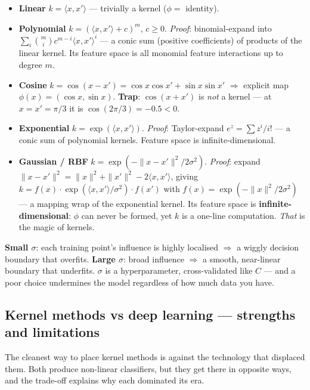 \documentclass[11pt, a4paper]{article}
\newcommand{\kw}[1]{\textbf{#1}}
\begin{document}
\begin{itemize}
  \item \kw{Linear} $k=\langle x,x'\rangle$ — trivially a kernel ($\phi=$ identity).
  \item \kw{Polynomial} $k=(\langle x,x'\rangle+c)^m$, $c\ge0$. \emph{Proof}: binomial-expand into
  $\sum_i\binom mi c^{m-i}\langle x,x'\rangle^i$ — a conic sum (positive coefficients) of products of
  the linear kernel. Its feature space is all monomial feature interactions up to degree $m$.
  \item \kw{Cosine} $k=\cos(x-x')=\cos x\cos x'+\sin x\sin x'$ $\Rightarrow$ explicit map
  $\phi(x)=(\cos x,\sin x)$. \kw{Trap}: $\cos(x{+}x')$ is \emph{not} a kernel — at $x=x'=\pi/3$ it is
  $\cos(2\pi/3)=-0.5<0$.
  \item \kw{Exponential} $k=\exp(\langle x,x'\rangle)$. \emph{Proof}: Taylor-expand
  $e^z=\sum z^i/i!$ — a conic sum of polynomial kernels. Feature space is infinite-dimensional.
  \item \kw{Gaussian / RBF} $k=\exp(-\|x-x'\|^2/2\sigma^2)$. \emph{Proof}: expand
  $\|x-x'\|^2=\|x\|^2+\|x'\|^2-2\langle x,x'\rangle$, giving
  $k=f(x)\cdot\exp(\langle x,x'\rangle/\sigma^2)\cdot f(x')$ with $f(x)=\exp(-\|x\|^2/2\sigma^2)$ —
  a mapping wrap of the exponential kernel. Its feature space is \kw{infinite-dimensional}: $\phi$
  can never be formed, yet $k$ is a one-line computation. \emph{That} is the magic of kernels.
\end{itemize}

\begin{notebox}
\kw{Small $\sigma$}: each training point's influence is highly localised $\Rightarrow$ a wiggly
decision boundary that overfits. \kw{Large $\sigma$}: broad influence $\Rightarrow$ a smooth,
near-linear boundary that underfits. $\sigma$ is a hyperparameter, cross-validated like $C$ — and a
poor choice undermines the model regardless of how much data you have.
\end{notebox}

\subsection{Kernel methods vs deep learning — strengths and limitations}

The cleanest way to place kernel methods is against the technology that displaced them. Both produce
non-linear classifiers, but they get there in opposite ways, and the trade-off explains why each
dominated its era.
\end{document}
